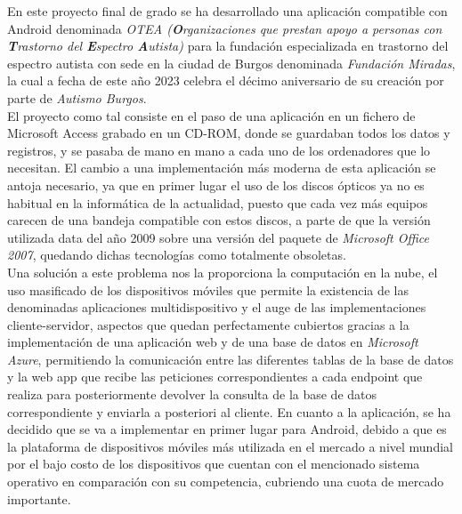 
 
En este proyecto final de grado se ha desarrollado una aplicación compatible con
Android denominada \textit{OTEA (\textbf{O}rganizaciones que prestan apoyo a
personas con \textbf{T}rastorno del \textbf{E}spectro \textbf{A}utista)} para la
fundación especializada en trastorno del espectro autista con sede en la ciudad
de Burgos denominada \textit{Fundación Miradas}, la cual a fecha de este año
2023 celebra el décimo aniversario de su creación por parte de \textit{Autismo
Burgos}.\\
El proyecto como tal consiste en el paso de una aplicación en un fichero de
Microsoft Access grabado en un CD-ROM, donde se guardaban todos los datos y
registros, y se pasaba de mano en mano a cada uno de los ordenadores que lo
necesitan.
El cambio a una implementación más moderna de esta aplicación se antoja
necesario, ya que en primer lugar el uso de los discos ópticos ya no es habitual
en la informática de la actualidad, puesto que cada vez más equipos carecen de
una bandeja compatible con estos discos, a parte de que la versión utilizada
data del año 2009 sobre una versión del paquete de \textit{Microsoft Office
2007}, quedando dichas tecnologías como totalmente obsoletas. \\
Una solución a este problema nos la proporciona la computación en la nube, el
uso masificado de los dispositivos móviles que permite la existencia de las
denominadas aplicaciones multidispositivo y el auge de las implementaciones
cliente-servidor, aspectos que quedan perfectamente cubiertos gracias a la
implementación de una aplicación web y de una base de datos en \textit{Microsoft
Azure}, permitiendo la comunicación entre las diferentes tablas de la base de
datos y la web app que recibe las peticiones correspondientes a cada endpoint
que realiza para posteriormente devolver la consulta de la base de datos
correspondiente y enviarla a posteriori al cliente. En cuanto a la aplicación,
se ha decidido que se va a implementar en primer lugar para Android, debido a
que es la plataforma de dispositivos móviles más utilizada en el mercado a nivel
mundial por el bajo costo de los dispositivos que cuentan con el mencionado
sistema operativo en comparación con su competencia, cubriendo una cuota de
mercado importante.
\\
